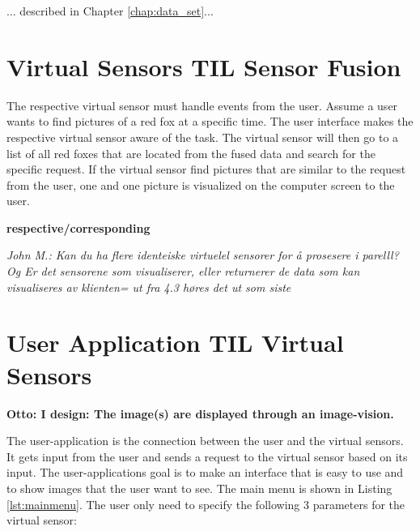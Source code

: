 \documentclass[USenglish]{uit-thesis}
\begin{document}
... described in Chapter \ref{chap:data_set}...



\section{Virtual Sensors TIL Sensor Fusion}
The respective virtual sensor must handle events from the user. Assume a user wants to find pictures of a red fox at a specific time.  The user interface makes the respective virtual sensor aware of the task. The virtual sensor will then go to a list of all red foxes that are located from the fused data and search for the specific request. If the virtual sensor find pictures that are similar to the request from the user, one and one picture is visualized on the computer screen to the user.

\textbf{respective/corresponding}

\textit{John M.: Kan du ha flere identeiske virtuelel sensorer for å prosesere i parelll? Og Er det sensorene som visualiserer, eller returnerer de data som kan  visualiseres av klienten= ut fra 4.3 høres det ut som siste}

\section{User Application TIL Virtual Sensors}
\textbf{Otto: I design: The image(s) are displayed through an image-vision.}

The user-application is the connection between  the user and the virtual sensors. It gets input from the user and sends a request to the virtual sensor based on its input. The user-applications goal is to make an interface that is easy to use and to show images that the user want to see. The main menu is shown in Listing \ref{lst:mainmenu}.
The user only need to specify the following 3 parameters for the virtual sensor:
\end{document}
